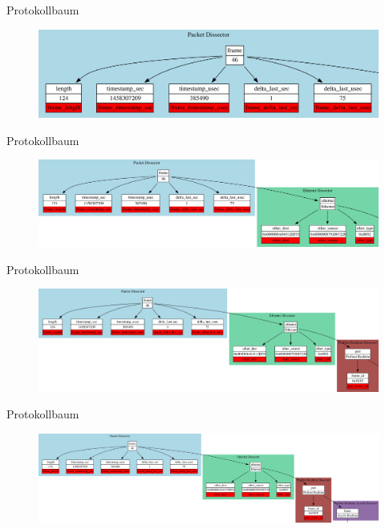\begin{frame}{Protokollbaum}
	\begin{figure}
		\centering
		\includegraphics[width=\textwidth]{./images/packet_path/proto_tree/1.png}
	\end{figure}
\end{frame}

\begin{frame}{Protokollbaum}
	\begin{figure}
		\centering
		\includegraphics[width=\textwidth]{./images/packet_path/proto_tree/2.png}
	\end{figure}
\end{frame}

\begin{frame}{Protokollbaum}
	\begin{figure}
		\centering
		\includegraphics[width=\textwidth]{./images/packet_path/proto_tree/3.png}
	\end{figure}
\end{frame}

\begin{frame}{Protokollbaum}
	\begin{figure}
		\centering
		\includegraphics[width=\textwidth]{./images/packet_path/proto_tree/4.png}
	\end{figure}
\end{frame}

